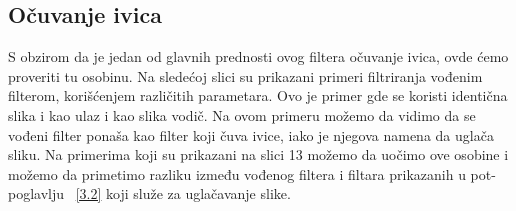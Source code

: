 \documentclass[a4paper,12pt,titlepage]{article}
\begin{document}
\subsection{Očuvanje ivica}%

S obzirom da je jedan od glavnih prednosti ovog filtera očuvanje ivica, ovde ćemo proveriti tu osobinu. Na sledećoj slici su prikazani primeri filtriranja vođenim filterom, korišćenjem različitih parametara. Ovo je primer gde se koristi identična slika i kao ulaz i kao slika vodič. Na ovom primeru možemo da vidimo da se vođeni filter ponaša kao filter koji čuva ivice, iako je njegova namena da uglača sliku. 
Na primerima koji su prikazani na slici 13 možemo da uočimo ove osobine i možemo da primetimo razliku između vođenog filtera i filtara prikazanih u pot-poglavlju ~\ref{3.2} koji služe za uglačavanje slike.
\end{document}
